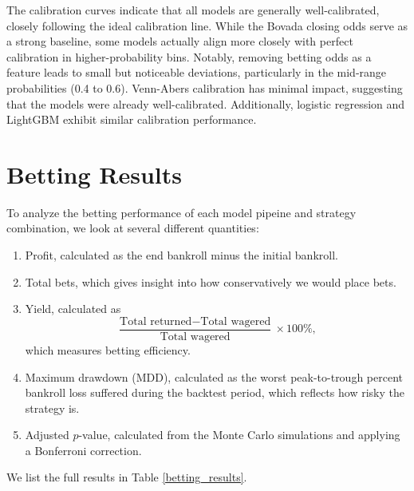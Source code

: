 \documentclass[12pt,twoside]{report}
\begin{document}
The calibration curves indicate that all models are generally well-calibrated, closely following the ideal calibration line. While the Bovada closing odds serve as a strong baseline, some models actually align more closely with perfect calibration in higher-probability bins. Notably, removing betting odds as a feature leads to small but noticeable deviations, particularly in the mid-range probabilities (0.4 to 0.6). Venn-Abers calibration has minimal impact, suggesting that the models were already well-calibrated. Additionally, logistic regression and LightGBM exhibit similar calibration performance.


\section{Betting Results}

To analyze the betting performance of each model pipeine and strategy combination, we look at several different quantities:
\begin{enumerate}
    \item Profit, calculated as the end bankroll minus the initial bankroll.

    \item Total bets, which gives insight into how conservatively we would place bets.

    \item Yield, calculated as
    $$\frac{\text{Total returned} - \text{Total wagered}}{\text{Total wagered}} \times 100\%,$$
    which measures betting efficiency.

    \item Maximum drawdown (MDD), calculated as the worst peak-to-trough percent bankroll loss suffered during the backtest period, which reflects how risky the strategy is.

    \item Adjusted $p$-value, calculated from the Monte Carlo simulations and applying a Bonferroni correction.
\end{enumerate}
We list the full results in Table \ref{betting_results}.
\end{document}
